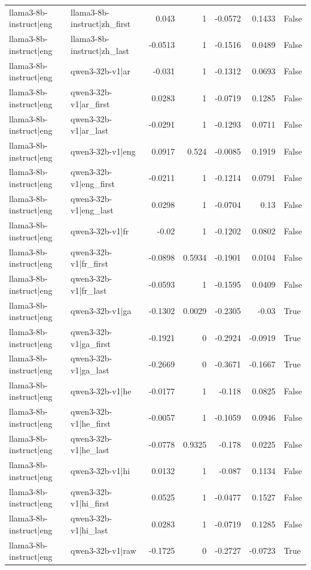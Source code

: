 \begin{table}
\begin{tabular}{l l r r r r l}
llama3-8b-instruct|eng & llama3-8b-instruct|zh_first & 0.043 & 1 & -0.0572 & 0.1433 & False \\
llama3-8b-instruct|eng & llama3-8b-instruct|zh_last & -0.0513 & 1 & -0.1516 & 0.0489 & False \\
llama3-8b-instruct|eng & qwen3-32b-v1|ar & -0.031 & 1 & -0.1312 & 0.0693 & False \\
llama3-8b-instruct|eng & qwen3-32b-v1|ar_first & 0.0283 & 1 & -0.0719 & 0.1285 & False \\
llama3-8b-instruct|eng & qwen3-32b-v1|ar_last & -0.0291 & 1 & -0.1293 & 0.0711 & False \\
llama3-8b-instruct|eng & qwen3-32b-v1|eng & 0.0917 & 0.524 & -0.0085 & 0.1919 & False \\
llama3-8b-instruct|eng & qwen3-32b-v1|eng_first & -0.0211 & 1 & -0.1214 & 0.0791 & False \\
llama3-8b-instruct|eng & qwen3-32b-v1|eng_last & 0.0298 & 1 & -0.0704 & 0.13 & False \\
llama3-8b-instruct|eng & qwen3-32b-v1|fr & -0.02 & 1 & -0.1202 & 0.0802 & False \\
llama3-8b-instruct|eng & qwen3-32b-v1|fr_first & -0.0898 & 0.5934 & -0.1901 & 0.0104 & False \\
llama3-8b-instruct|eng & qwen3-32b-v1|fr_last & -0.0593 & 1 & -0.1595 & 0.0409 & False \\
llama3-8b-instruct|eng & qwen3-32b-v1|ga & -0.1302 & 0.0029 & -0.2305 & -0.03 & True \\
llama3-8b-instruct|eng & qwen3-32b-v1|ga_first & -0.1921 & 0 & -0.2924 & -0.0919 & True \\
llama3-8b-instruct|eng & qwen3-32b-v1|ga_last & -0.2669 & 0 & -0.3671 & -0.1667 & True \\
llama3-8b-instruct|eng & qwen3-32b-v1|he & -0.0177 & 1 & -0.118 & 0.0825 & False \\
llama3-8b-instruct|eng & qwen3-32b-v1|he_first & -0.0057 & 1 & -0.1059 & 0.0946 & False \\
llama3-8b-instruct|eng & qwen3-32b-v1|he_last & -0.0778 & 0.9325 & -0.178 & 0.0225 & False \\
llama3-8b-instruct|eng & qwen3-32b-v1|hi & 0.0132 & 1 & -0.087 & 0.1134 & False \\
llama3-8b-instruct|eng & qwen3-32b-v1|hi_first & 0.0525 & 1 & -0.0477 & 0.1527 & False \\
llama3-8b-instruct|eng & qwen3-32b-v1|hi_last & 0.0283 & 1 & -0.0719 & 0.1285 & False \\
llama3-8b-instruct|eng & qwen3-32b-v1|raw & -0.1725 & 0 & -0.2727 & -0.0723 & True \\

\end{tabular}
\end{table}

